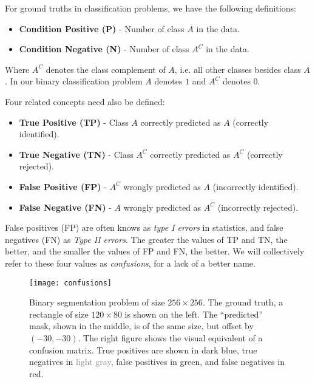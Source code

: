 For ground truths in classification problems, we have the following definitions:

\begin{itemize}[noitemsep]
  \item \textbf{Condition Positive (P)} - Number of class $A$ in the data.
  \item \textbf{Condition Negative (N)} - Number of class $A^C$ in the data.
\end{itemize}

Where $A^C$ denotes the class complement of $A$, i.e. all other classes besides class $A$.
In our binary classification problem $A$ denotes $1$ and $A^C$ denotes $0$.

Four related concepts need also be defined:

\begin{itemize}[noitemsep]
  \item \textbf{True Positive (TP)} - Class $A$ correctly predicted as $A$ (correctly identified).
  \item \textbf{True Negative (TN)} - Class $A^C$ correctly predicted as $A^C$ (correctly rejected).
  \item \textbf{False Positive (FP)} - $A^C$ wrongly predicted as $A$ (incorrectly identified).
  \item \textbf{False Negative (FN)} - $A$ wrongly predicted as $A^C$ (incorrectly rejected).
\end{itemize}

False positives (FP) are often knows as \textit{type I errors} in statistics, and false negatives (FN) as \textit{Type II errors}.
The greater the values of TP and TN, the better, and the smaller the values of FP and FN, the better. We will collectively refer to these four values as \textit{confusions}, for a lack of a better name.

\begin{figure}[htb]
  \texttt{[image: confusions]}
  \caption{
    Binary segmentation problem of size $256 \times 256$.
    The ground truth, a rectangle of size $120 \times 80$ is shown on the left.
    The \enquote{predicted} mask, shown in the middle, is of the same size, but offset by $(-30, -30)$.
    The right figure shows the visual equivalent of a confusion matrix.
    True positives are shown in \textcolor{tp}{dark blue}, true negatives in \textcolor{gray}{light gray}, false positives in \textcolor{fp}{green}, and false negatives in \textcolor{fn}{red}.
  }
  \label{fig:confusions}
\end{figure}

